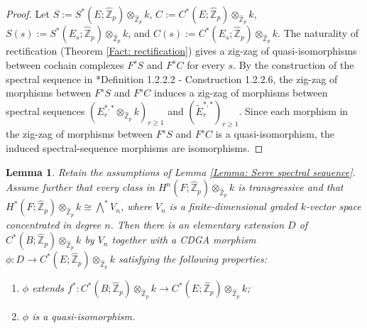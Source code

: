 \documentclass[11pt]{amsart}
\newtheorem{lemma}[theorem]{Lemma}
\theoremstyle{definition}
\numberwithin{equation}{section}
\numberwithin{equation}{section}
\newcommand\ZZ{\mathbb{Z}}
\begin{document}
\begin{proof}
Let $S:=S^*(E;\widehat{\ZZ}_p)\otimes_{\widehat{\ZZ}_p} k$, $C:=C^*(E;\widehat{\ZZ}_p)\otimes_{\widehat{\ZZ}_p} k$, $S(s):=S^*(E_s;\widehat{\ZZ}_p)\otimes_{\widehat{\ZZ}_p} k$, and $C(s):=C^*(E_s;\widehat{\ZZ}_p)\otimes_{\widehat{\ZZ}_p} k$. The naturality of rectification (Theorem \ref{Fact: rectification}) gives a zig-zag of quasi-isomorphisms between cochain complexes $F^s S$ and $F^s C$ for every $s$.
By the construction of the spectral sequence in \cite{Lurie-higher-algebra}*{Definition 1.2.2.2 - Construction 1.2.2.6}, the zig-zag of morphisms between $F^s S$ and $F^s C$ induces a zig-zag of morphisms between  spectral sequences $(E^{*,*}_r\otimes_{\widehat{\ZZ}_p} k)_{r\geq 1}$ and $(\widetilde{E}^{*,*}_r)_{r\geq 1}$. Since each morphism in the zig-zag of morphisms between $F^s S$ and $F^s C$ is a quasi-isomorphism, the induced spectral-sequence morphisms are isomorphisms.
\end{proof}

\begin{lemma}\label{Lemma: fibration and elementary extension}
Retain the assumptions of Lemma \ref{Lemma: Serre spectral sequence}. Assume further that every class in $H^{n}(F;\widehat{\ZZ}_p)\otimes_{\widehat{\ZZ}_p} k$ is transgressive and that $H^*(F;\widehat{\ZZ}_p)\otimes_{\widehat{\ZZ}_p} k\cong \bigwedge^*V_n$, where $V_n$  is a finite-dimensional graded $k$-vector space concentrated in degree $n$. Then there is an elementary extension $D$ of $C^*(B;\widehat{\ZZ}_p)\otimes_{\widehat{\ZZ}_p} k$ by $V_n$ together with a CDGA morphism $\phi:D\rightarrow C^*(E;\widehat{\ZZ}_p)\otimes_{\widehat{\ZZ}_p} k$ satisfying the following properties:
\begin{enumerate}[leftmargin=0.25in]
    \item $\phi$ extends $f^*:C^*(B;\widehat{\ZZ}_p)\otimes_{\widehat{\ZZ}_p} k\rightarrow C^*(E;\widehat{\ZZ}_p)\otimes_{\widehat{\ZZ}_p} k$; 
    \item $\phi$ is a quasi-isomorphism.
\end{enumerate}
\end{lemma}
\end{document}
